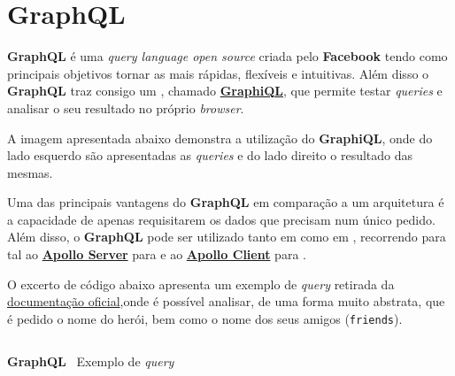 \section{GraphQL}

\begin{minipage}[t]{.3\textwidth}
\end{minipage}
\begin{minipage}[t]{.7\textwidth}
	\minipagerestore
	\textbf{GraphQL} é uma \textit{query language open source} criada pelo \textbf{Facebook} tendo como principais objetivos tornar as  mais rápidas, flexíveis e intuitivas. Além disso o \textbf{GraphQL} traz consigo um , chamado \textbf{\href{https://github.com/graphql/graphiql}{GraphiQL}}, que permite testar \textit{queries} e analisar o seu resultado no próprio \textit{browser}.

	A imagem apresentada abaixo demonstra a utilização do \textbf{GraphiQL}, onde do lado esquerdo são apresentadas as \textit{queries} e do lado direito o resultado das mesmas.
\end{minipage}


Uma das principais vantagens do \textbf{GraphQL} em comparação a um arquitetura  é a capacidade de apenas requisitarem os dados que precisam num único pedido. Além disso, o \textbf{GraphQL} pode ser utilizado tanto em  como em , recorrendo para tal ao \href{https://www.apollographql.com/docs/apollo-server/}{\textbf{Apollo Server}} para  e ao \textbf{\href{https://www.apollographql.com/docs/react/}{Apollo Client}} para .

O excerto de código abaixo apresenta um exemplo de \textit{query} retirada da \href{https://graphql.org/learn/queries/}{documentação oficial},onde é possível analisar, de uma forma muito abstrata, que é pedido o nome do herói, bem como o nome dos seus amigos (\texttt{friends}).

\begin{longlisting}
	\inputminted{text}{code/graphql/example-query.graphql}
	\caption{\textbf{GraphQL} \textemdash~Exemplo de \textit{query}}
\end{longlisting}

